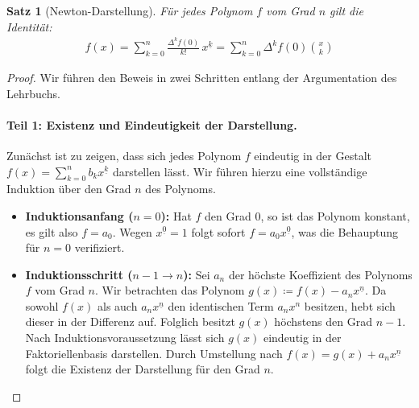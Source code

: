 \documentclass{article}
\newtheorem{thm}{Satz}
\theoremstyle{definition}
\begin{document}
\begin{thm}[Newton-Darstellung]
Für jedes Polynom $f$ vom Grad $n$ gilt die Identität:
\begin{align*}
    f(x) = \sum_{k=0}^{n} \frac{\Delta^k f(0)}{k!}\, x^{\underline k} = \sum_{k=0}^{n} \Delta^k f(0) \binom{x}{k}
\end{align*}
\end{thm}

\begin{proof}
Wir führen den Beweis in zwei Schritten entlang der Argumentation des Lehrbuchs.

\paragraph{Teil 1: Existenz und Eindeutigkeit der Darstellung.}
Zunächst ist zu zeigen, dass sich jedes Polynom $f$ eindeutig in der Gestalt $f(x) = \sum_{k=0}^{n} b_k x^{\underline{k}}$ darstellen lässt. Wir führen hierzu eine vollständige Induktion über den Grad $n$ des Polynoms.
\begin{itemize}
    \item \textbf{Induktionsanfang ($n=0$):} Hat $f$ den Grad $0$, so ist das Polynom konstant, es gilt also $f = a_0$. Wegen $x^{\underline{0}} = 1$ folgt sofort $f = a_0 x^{\underline{0}}$, was die Behauptung für $n=0$ verifiziert.
    \item \textbf{Induktionsschritt ($n-1 \to n$):} Sei $a_n$ der höchste Koeffizient des Polynoms $f$ vom Grad $n$. Wir betrachten das Polynom $g(x) \coloneqq f(x) - a_n x^{\underline{n}}$. Da sowohl $f(x)$ als auch $a_n x^{\underline{n}}$ den identischen Term $a_n x^n$ besitzen, hebt sich dieser in der Differenz auf. Folglich besitzt $g(x)$ höchstens den Grad $n-1$. Nach Induktionsvoraussetzung lässt sich $g(x)$ eindeutig in der Faktoriellenbasis darstellen. Durch Umstellung nach $f(x) = g(x) + a_n x^{\underline{n}}$ folgt die Existenz der Darstellung für den Grad $n$.
\end{itemize}


\end{proof}
\end{document}
